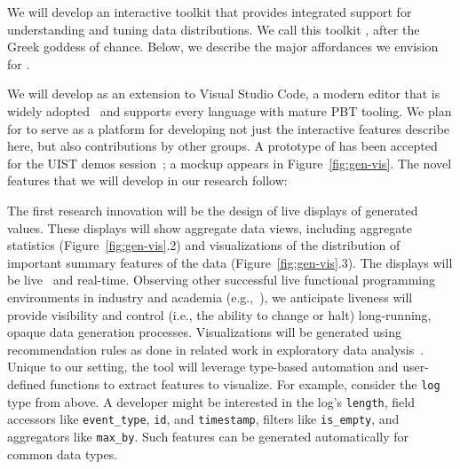  { %
 We will develop an interactive toolkit that provides integrated
 support for understanding and tuning data distributions.
We call this toolkit \tyche{}, after the Greek goddess of
chance. Below, we describe the major affordances we envision
for \tyche{}.

We will develop \tyche{}
as an extension to Visual Studio Code, a modern editor that is widely
adopted~\cite{noauthor_stack_nodate} and supports every language
with mature PBT tooling. We plan for \tyche{} to serve as a platform
for developing not just the interactive features describe here, but
also contributions
by other groups. A prototype of \tyche{} has been
accepted for the UIST demos session~\cite{ref:goldstein2023tyche}; a
mockup appears in Figure~\ref{fig:gen-vis}. The novel features that we
will develop in our research follow:

The first research innovation will be the design of live displays of generated
values. These displays
will show aggregate data views, including aggregate
statistics (Figure~\ref{fig:gen-vis}.2) and visualizations of the distribution
of important summary features of the data (Figure~\ref{fig:gen-vis}.3). The
displays will be live~\cite{ref:tanimoto1990viva} and
real-time. Observing other successful live functional programming
environments in industry and academia
(e.g.,~\cite{tool:lighttable,ref:omar2019live}), we anticipate liveness will
provide visibility and control (i.e., the ability to change or halt)
long-running, opaque data generation processes.  Visualizations will be
generated using recommendation rules as done in related work in exploratory data
analysis~\cite{ref:lee2021lux,wongsuphasawat_voyager_2016,
wongsuphasawat_voyager_2017}. Unique to our setting, the tool will leverage
type-based automation and user-defined functions to extract features to
visualize.
For example, consider the
\lstinline{log} type
from above. A developer might be interested in the log's
\lstinline{length}, field accessors like \lstinline{event_type}, \lstinline{id},
and \lstinline{timestamp}, filters like \lstinline{is_empty}, and
aggregators like \lstinline{max_by}. Such features can be
generated automatically for common data types.

}

